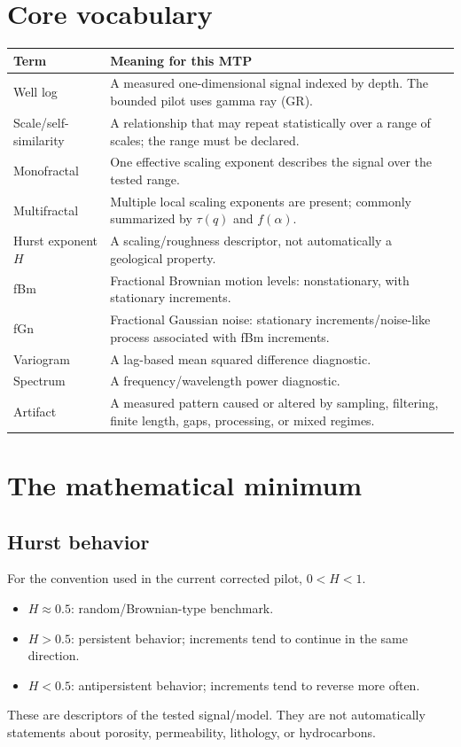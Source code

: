 \documentclass[11pt,a4paper]{article}
\begin{document}
\section{Core vocabulary}
\begin{tabular}{>{\raggedright\arraybackslash}p{} p{}}
\toprule
\textbf{Term} & \textbf{Meaning for this MTP}\\
\midrule
Well log & A measured one-dimensional signal indexed by depth. The bounded pilot uses gamma ray (GR).\\
Scale/self-similarity & A relationship that may repeat statistically over a range of scales; the range must be declared.\\
Monofractal & One effective scaling exponent describes the signal over the tested range.\\
Multifractal & Multiple local scaling exponents are present; commonly summarized by $\tau(q)$ and $f(\alpha)$.\\
Hurst exponent $H$ & A scaling/roughness descriptor, not automatically a geological property.\\
fBm & Fractional Brownian motion levels: nonstationary, with stationary increments.\\
fGn & Fractional Gaussian noise: stationary increments/noise-like process associated with fBm increments.\\
Variogram & A lag-based mean squared difference diagnostic.\\
Spectrum & A frequency/wavelength power diagnostic.\\
Artifact & A measured pattern caused or altered by sampling, filtering, finite length, gaps, processing, or mixed regimes.\\
\bottomrule
\end{tabular}

\section{The mathematical minimum}
\subsection{Hurst behavior}
For the convention used in the current corrected pilot, $0<H<1$.
\begin{itemize}
\item $H\approx0.5$: random/Brownian-type benchmark.
\item $H>0.5$: persistent behavior; increments tend to continue in the same direction.
\item $H<0.5$: antipersistent behavior; increments tend to reverse more often.
\end{itemize}
These are descriptors of the tested signal/model. They are not automatically statements about porosity, permeability, lithology, or hydrocarbons.
\end{document}
